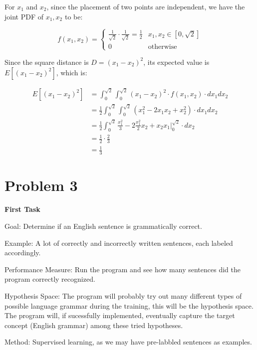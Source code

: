 \documentclass[12pt]{article}
\begin{document}
For $x_1$ and $x_2$, since the placement of two points are independent, we have the joint PDF of $x_1, x_2$ to be:

\[ f(x_1,x_2) = \begin{cases}
      \frac{1}{\sqrt{2}} \cdot \frac{1}{\sqrt{2}} = \frac{1}{2} & x_1, x_2 \in [0, \sqrt{2}]\\
      0 & \text{otherwise}
   \end{cases}
\]

Since the square distance is $D = (x_1 - x_2) ^ 2$, its expected value is $E[(x_1 - x_2)^2]$, which is:

\begin{align*}
    E[(x_1 - x_2)^2] &=   \int^{\sqrt{2}}_{0} \int^{\sqrt{2}}_{0} (x_1 - x_2)^2 \cdot f(x_1, x_2) \cdot dx_1 dx_2 \\
    &= \frac{1}{2} \int^{\sqrt{2}}_{0} \int^{\sqrt{2}}_{0} (x_1^2 - 2 x_1 x_2 + x_2^2) \cdot dx_1 dx_2 \\
    &= \frac{1}{2} \int^{\sqrt{2}}_{0}  \frac{x_1^2}{3} - 2\frac{x_1^2}{2}x_2 + x_2 x_1 \Big|^{\sqrt{2}}_{0} \cdot dx_2\\
    &= \frac{1}{2} \cdot \frac{2}{3} \\
    &= \frac{1}{3}
\end{align*}

\section{Problem 3}

\textbf{First Task}

Goal: Determine if an English sentence is grammatically correct.

Example: A lot of correctly and incorrectly written sentences, each labeled accordingly.

Performance Measure: Run the program and see how many sentences did the program correctly recognized.

Hypothesis Space: The program will probably try out many different types of possible language grammar during the training, this will be the hypothesis space. The program will, if sucessfully implemented, eventually capture the target concept (English grammar) among these tried hypotheses.

Method: Supervised learning, as we may have pre-labbled sentences as examples.\newline
\end{document}
